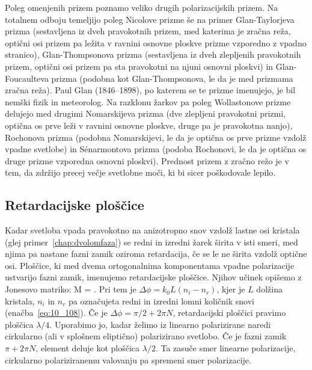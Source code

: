 \begin{remark}
Poleg omenjenih prizem poznamo veliko drugih polarizacijskih prizem. Na totalnem odboju temeljijo
poleg Nicolove prizme še na primer Glan-Taylorjeva prizma (sestavljena iz dveh pravokotnih prizem, 
med katerima je zračna reža, optični osi prizem pa ležita v ravnini osnovne ploskve prizme vzporedno 
z vpadno stranico), Glan-Thompsonova prizma (sestavljena iz dveh zlepljenih pravokotnih prizem, 
optični osi prizem pa sta pravokotni na njuni osnovni ploskvi) in Glan-Foucaulteva prizma 
(podobna kot Glan-Thompsonova, le da je med prizmama zračna reža). Paul Glan (1846--1898), 
po katerem se te prizme imenujejo, je bil nemški fizik in meteorolog. Na razklonu žarkov
pa poleg Wollastonove prizme delujejo med drugimi Nomarskijeva prizma (dve zlepljeni pravokotni prizmi, 
optična os prve leži v ravnini osnovne ploskve, druge pa je pravokotna nanjo), Rochonova prizma
(podobna Nomarskijevi, le da je optična os prve prizme vzdolž vpadne svetlobe) in 
S\'enarmontova prizma (podoba Rochonovi, le da je optična os druge prizme vzporedna osnovni ploskvi). Prednost
prizem z zračno režo je v tem, da zdržijo precej večje svetlobne moči, ki bi sicer poškodovale lepilo.
\end{remark}

\subsection*{Retardacijske ploščice}
Kadar svetloba vpada pravokotno na anizotropno snov vzdolž lastne osi kristala 
(glej primer~\ref{chap:dvolomfaza}) se redni in 
izredni žarek širita v isti smeri, med njima pa nastane fazni zamik oziroma retardacija, če se le 
ne širita vzdolž optične osi.
Ploščice, ki med dvema ortogonalnima komponentama vpadne polarizacije ustvarijo
fazni zamik, imenujemo retardacijske ploščice. Njihov učinek opišemo z Jonesovo matriko:
\beq
M = 
\!\!.
\label{eq:10_120}
\eeq
Pri tem je $\Delta \phi = k_0 L (n_i-n_r)$, kjer je $L$ dolžina kristala, $n_i$ in $n_r$
pa označujeta redni in izredni lomni količnik snovi (enačba~\ref{eq:10_108}). 
Če je $\Delta \phi= \pi/2 + 2\pi N$, retardacijski ploščici pravimo ploščica $\lambda/4$. 
Uporabimo jo, kadar želimo iz linearno polarizirane naredi cirkularno (ali v splošnem eliptično)
polarizirano svetlobo. 
Če je fazni zamik $\pi + 2\pi N$, element deluje kot ploščica $\lambda/2$. Ta zasuče smer 
linearne polarizacije, cirkularno polariziranemu valovanju pa spremeni smer polarizacije.

